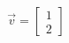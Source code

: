 \documentclass[preview]{standalone}
\begin{document}
\begin{align*}
\vec{v} = \begin{bmatrix} 1 \\ 2 \end{bmatrix}
\end{align*}
\end{document}
